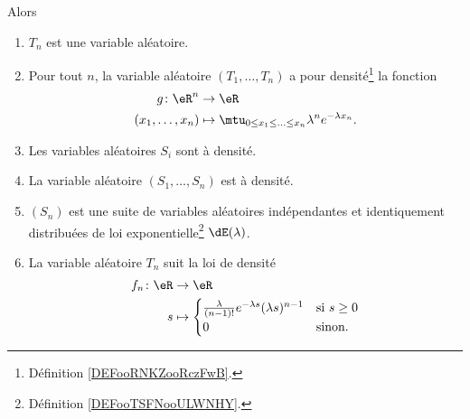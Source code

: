 \begin{theorem}
	Alors
	\begin{enumerate}
		\item       \label{ITEMooSLWOooRjYhBA}
		      \( T_n\) est une variable aléatoire.
		\item   \label{ITEMooHGXTooOdonXa}
		      Pour tout \( n\), la variable aléatoire \( (T_1,\ldots, T_n)\) a pour densité\footnote{Définition \ref{DEFooRNKZooRczFwB}.} la fonction
		      \begin{equation}
			      \begin{aligned}
				      g\colon \eR^n     & \to \eR                                                                \\
				      (x_1,\ldots, x_n) & \mapsto \mtu_{0\leq x_1\leq \ldots\leq x_n}\lambda^n e^{-\lambda x_n}.
			      \end{aligned}
		      \end{equation}
		\item       \label{ITEMooGBIXooSjXpsx}
		      Les variables aléatoires \( S_i\) sont à densité.
		\item       \label{ITEMooUTTWooOUhkZh}
		      La variable aléatoire \( (S_1,\ldots, S_n)\) est à densité.
		\item       \label{ITEMooUZGFooAbCvvG}
		      \( (S_n)\) est une suite de variables aléatoires indépendantes et identiquement distribuées de loi exponentielle\footnote{Définition \ref{DEFooTSFNooULWNHY}.} \( \dE(\lambda)\).
		\item   \label{ITEMooDXZFooXkklhG}
		      La variable aléatoire \( T_n\) suit la loi de densité
		      \begin{equation}
			      \begin{aligned}
				      f_n\colon \eR & \to \eR                                                                                 \\
				      s             & \mapsto \begin{cases}
					                              \frac{ \lambda }{ (n-1)! } e^{-\lambda s}(\lambda s)^{n-1} & \text{si } s\geq 0 \\
					                              0                                                          & \text{sinon. }
				                              \end{cases} \\
			      \end{aligned}
		      \end{equation}
	\end{enumerate}
\end{theorem}

